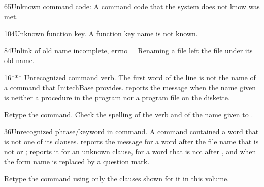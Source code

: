 \begin{XbaseMessageEntry}{65}{Unknown command code:}
A command code that the system does not know was met.
\end{XbaseMessageEntry}

\begin{XbaseMessageEntry}{104}{Unknown function key.}
A function key name is not known.
\end{XbaseMessageEntry}

\begin{XbaseMessageEntry}{84}{Unlink of old name incomplete, errno =}
Renaming a file left the file under its old name.
\end{XbaseMessageEntry}

\begin{XbaseMessageEntry}{16}{*** Unrecognized command verb.}
The first word of the line is not the name of a command that InitechBase provides.  reports the message when the name given is neither a procedure in the program nor a program file on the diskette.

Retype the command. Check the spelling of the verb and of the name given to .
\end{XbaseMessageEntry}

\begin{XbaseMessageEntry}{36}{Unrecognized phrase/keyword in command.}
A command contained a word that is not one of its clauses.  reports the message for a word after the file name that is not  or ;  reports it for an unknown clause, for a word that is not  after , and when the form name is replaced by a question mark.

Retype the command using only the clauses shown for it in this volume.
\end{XbaseMessageEntry}

